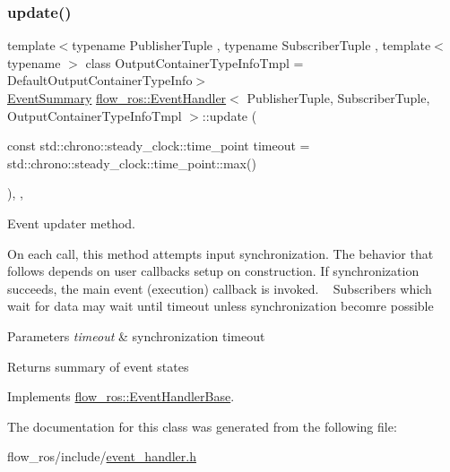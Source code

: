 \subsubsection{\texorpdfstring{update()}{update()}}
{\footnotesize\ttfamily template$<$typename Publisher\+Tuple , typename Subscriber\+Tuple , template$<$ typename $>$ class Output\+Container\+Type\+Info\+Tmpl = Default\+Output\+Container\+Type\+Info$>$ \\
\hyperlink{structflow__ros_1_1_event_summary}{Event\+Summary} \hyperlink{classflow__ros_1_1_event_handler}{flow\+\_\+ros\+::\+Event\+Handler}$<$ Publisher\+Tuple, Subscriber\+Tuple, Output\+Container\+Type\+Info\+Tmpl $>$\+::update (\begin{DoxyParamCaption}\item[{const std\+::chrono\+::steady\+\_\+clock\+::time\+\_\+point}]{timeout = {\ttfamily std\+:\+:chrono\+:\+:steady\+\_\+clock\+:\+:time\+\_\+point\+:\+:max()} }\end{DoxyParamCaption})\hspace{0.3cm}{\ttfamily [inline]}, {\ttfamily [override]}, {\ttfamily [virtual]}}



Event updater method. 

On each call, this method attempts input synchronization. The behavior that follows depends on user callbacks setup on construction. If synchronization succeeds, the main event (execution) callback is invoked. ~\newline
 Subscribers which wait for data may wait until {\ttfamily timeout} unless synchronization becomre possible


\begin{DoxyParams}{Parameters}
{\em timeout} & synchronization timeout\\
\hline
\end{DoxyParams}
\begin{DoxyReturn}{Returns}
summary of event states 
\end{DoxyReturn}


Implements \hyperlink{classflow__ros_1_1_event_handler_base_a5a4d9baa42d26f4d639b69ebbcc2aa0a}{flow\+\_\+ros\+::\+Event\+Handler\+Base}.



The documentation for this class was generated from the following file\+:\begin{DoxyCompactItemize}
\item 
flow\+\_\+ros/include/\hyperlink{event__handler_8h}{event\+\_\+handler.\+h}\end{DoxyCompactItemize}
